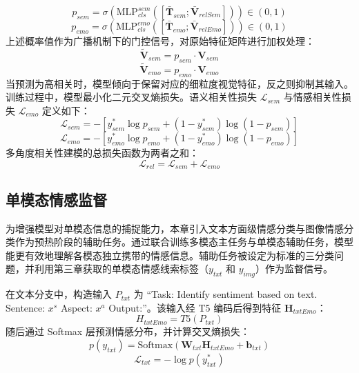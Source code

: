 \begin{equation}
p_{sem} = \sigma(\text{MLP}_{cls}^{sem}([\bar{\mathbf{T}}_{sem}; \bar{\mathbf{V}}_{relSem}])) \in (0, 1)
\end{equation}
\begin{equation}
p_{emo} = \sigma(\text{MLP}_{cls}^{emo}([\bar{\mathbf{T}}_{emo}; \bar{\mathbf{V}}_{relEmo}])) \in (0, 1) 
\end{equation}
上述概率值作为广播机制下的门控信号，对原始特征矩阵进行加权处理：
\begin{equation}
\tilde{\mathbf{V}}_{sem} = p_{sem} \cdot \mathbf{V}_{sem}
\end{equation}
\begin{equation}
\tilde{\mathbf{V}}_{emo} = p_{emo} \cdot \mathbf{V}_{emo}
\end{equation}
当预测为高相关时，模型倾向于保留对应的细粒度视觉特征，反之则抑制其输入。训练过程中，模型最小化二元交叉熵损失。语义相关性损失 $\mathcal{L}_{sem}$ 与情感相关性损失 $\mathcal{L}_{emo}$ 定义如下：
\begin{equation}
    \mathcal{L}_{sem} = - \left[ y_{sem}^* \log p_{sem} + (1 - y_{sem}^*) \log (1 - p_{sem}) \right]
\end{equation}
\begin{equation}
    \mathcal{L}_{emo} = - \left[ y_{emo}^* \log p_{emo} + (1 - y_{emo}^*) \log (1 - p_{emo}) \right]
\end{equation}
多角度相关性建模的总损失函数为两者之和：
\begin{equation}
    \mathcal{L}_{rel} = \mathcal{L}_{sem} + \mathcal{L}_{emo}
\end{equation}

\subsection{单模态情感监督}
为增强模型对单模态信息的捕捉能力，本章引入文本方面级情感分类与图像情感分类作为预热阶段的辅助任务。通过联合训练多模态主任务与单模态辅助任务，模型能更有效地理解各模态独立携带的情感信息。辅助任务被设定为标准的三分类问题，并利用第三章获取的单模态情感线索标签（$y_{txt}$ 和 $y_{img}$）作为监督信号。

在文本分支中，构造输入 $P_{txt}$ 为 “Task: Identify sentiment based on text. Sentence: {$x^s$} Aspect: {$x^a$} Output:”。该输入经 T5 编码后得到特征 $\mathbf{H}_{txtEmo}$：
\begin{equation}
H_{txtEmo}=T5(P_{txt})
\end{equation}
随后通过 Softmax 层预测情感分布，并计算交叉熵损失：
\begin{equation}
    p(y_{txt}) = \text{Softmax}(\mathbf{W}_{txt} \mathbf{H}_{txtEmo} + \mathbf{b}_{txt})
\end{equation}
\begin{equation}
    \mathcal{L}_{txt} = - \log p(y_{txt}^*)
\end{equation}

